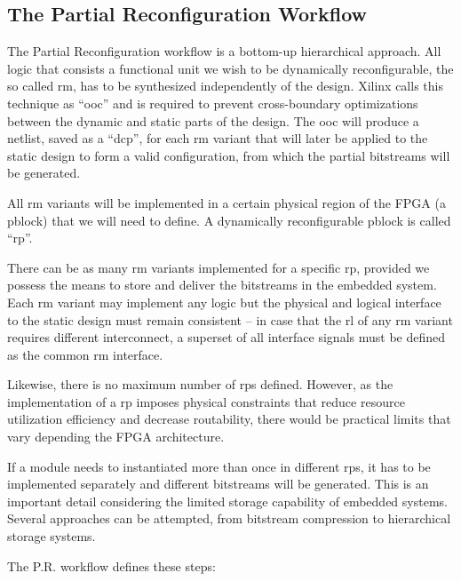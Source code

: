 \subsection{The Partial Reconfiguration Workflow}
\label{sec:pr-workflow}

The Partial Reconfiguration workflow is a bottom-up hierarchical approach.
All logic that consists a functional unit we wish to be dynamically reconfigurable,
the so called \gls{rm}, has to be synthesized independently of the design.
Xilinx calls this technique as ``\gls{ooc}'' and is required to prevent
cross-boundary optimizations between the dynamic and static parts of the design.
The \gls{ooc} will produce a netlist, saved as a ``\gls{dcp}'', for each \gls{rm} variant
that will later be applied to the static design to form a valid configuration,
from which the partial bitstreams will be generated.

All \gls{rm} variants will be implemented in a certain physical region of the FPGA
(a \gls{pblock}) that we will need to define. A dynamically reconfigurable \gls{pblock}
is called ``\gls{rp}''.

There can be as many \gls{rm} variants implemented for a specific \gls{rp},
provided we possess the means to store and deliver the bitstreams in the embedded system.
Each \gls{rm} variant may implement any logic but the physical and logical interface
to the static design must remain consistent -- in case that the \gls{rl} of any \gls{rm} variant
requires different interconnect,
a superset of all interface signals must be defined as the common \gls{rm} interface.

Likewise, there is no maximum number of \glspl{rp} defined. However, as the implementation
of a \gls{rp} imposes physical constraints that reduce resource utilization efficiency and decrease
routability, there would be practical limits that vary depending the FPGA architecture.

If a module needs to instantiated more than once in different \glspl{rp}, it has to be
implemented separately and different bitstreams will be generated.
This is an important detail considering the limited storage capability of embedded systems.
Several approaches can be attempted, from bitstream compression to hierarchical storage systems.

The P.R. workflow defines these steps:

